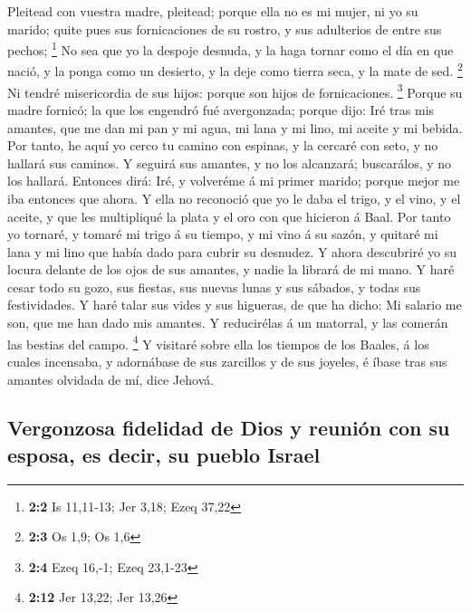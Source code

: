  Pleitead con vuestra madre, pleitead; porque ella no es mi
mujer, ni yo su marido; quite pues sus fornicaciones de su rostro, y sus
adulterios de entre sus pechos; \footnote{\textbf{2:2} Is 11,11-13; Jer
  3,18; Ezeq 37,22}  No sea que yo la despoje desnuda, y la
haga tornar como el día en que nació, y la ponga como un desierto, y la
deje como tierra seca, y la mate de sed. \footnote{\textbf{2:3} Os 1,9;
  Os 1,6}  Ni tendré misericordia de sus hijos: porque son
hijos de fornicaciones. \footnote{\textbf{2:4} Ezeq 16,-1; Ezeq 23,1-23}
 Porque su madre fornicó; la que los engendró fué
avergonzada; porque dijo: Iré tras mis amantes, que me dan mi pan y mi
agua, mi lana y mi lino, mi aceite y mi bebida.  Por tanto,
he aquí yo cerco tu camino con espinas, y la cercaré con seto, y no
hallará sus caminos.  Y seguirá sus amantes, y no los
alcanzará; buscarálos, y no los hallará. Entonces dirá: Iré, y volveréme
á mi primer marido; porque mejor me iba entonces que ahora. 
Y ella no reconoció que yo le daba el trigo, y el vino, y el aceite, y
que les multipliqué la plata y el oro con que hicieron á Baal.
 Por tanto yo tornaré, y tomaré mi trigo á su tiempo, y mi
vino á su sazón, y quitaré mi lana y mi lino que había dado para cubrir
su desnudez.  Y ahora descubriré yo su locura delante de
los ojos de sus amantes, y nadie la librará de mi mano.  Y
haré cesar todo su gozo, sus fiestas, sus nuevas lunas y sus sábados, y
todas sus festividades.  Y haré talar sus vides y sus
higueras, de que ha dicho: Mi salario me son, que me han dado mis
amantes. Y reducirélas á un matorral, y las comerán las bestias del
campo. \footnote{\textbf{2:12} Jer 13,22; Jer 13,26}  Y
visitaré sobre ella los tiempos de los Baales, á los cuales incensaba, y
adornábase de sus zarcillos y de sus joyeles, é íbase tras sus amantes
olvidada de mí, dice Jehová.

\hypertarget{vergonzosa-fidelidad-de-dios-y-reuniuxf3n-con-su-esposa-es-decir-su-pueblo-israel}{%
\subsection{Vergonzosa fidelidad de Dios y reunión con su esposa, es
decir, su pueblo
Israel}\label{vergonzosa-fidelidad-de-dios-y-reuniuxf3n-con-su-esposa-es-decir-su-pueblo-israel}}

